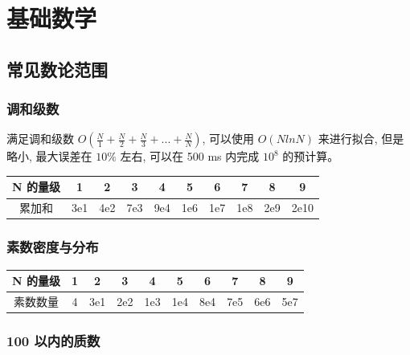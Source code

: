 \documentclass[a4paper,12pt]{article}
\begin{document}
\newpage

\section{基础数学}

\subsection{常见数论范围}

\subsubsection{调和级数}

\noindent 满足调和级数 $O(\frac{N}{1} + \frac{N}{2} + \frac{N}{3} + ... + \frac{N}{N})$, 
可以使用 $O(NlnN)$ 来进行拟合, 但是略小, 最大误差在 $10 \%$ 左右, 可以在 500 ms 内完成 $10^8$ 的预计算。

\begin{table}[htbp]
\centering
\begin{tabular}{c|ccccccccc} %
\toprule
N 的量级 & 1    & 2    & 3     & 4      & 5       & 6        & 7         & 8          & 9           \\
\midrule
累加和   & 3e1 & 4e2  & 7e3   & 9e4   & 1e6    & 1e7     & 1e8      & 2e9       & 2e10       \\
\bottomrule
\end{tabular}
\end{table}

\subsubsection{素数密度与分布}

\begin{table}[htbp]
\centering
\begin{tabular}{c|ccccccccc}
\toprule
N 的量级 & 1    & 2    & 3     & 4      & 5       & 6        & 7         & 8          & 9           \\
\midrule
素数数量 & 4  & 3e1  & 2e2   & 1e3    & 1e4     & 8e4      & 7e5       & 6e6        & 5e7         \\
\bottomrule
\end{tabular}
\end{table}

\subsubsection{100 以内的质数}
\end{document}
